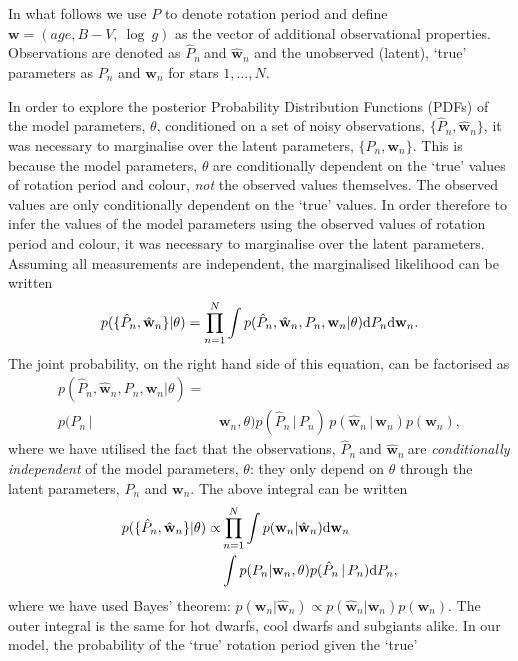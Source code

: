 \documentclass[useAMS, usenatbib]{mn2e}
\newcommand{\w}{\mathbf{w}}
\newcommand{\wh}{$\hat{\mathbf{w}}_n$}
\newcommand{\ph}{$\hat{P}_n$}
\begin{document}
In what follows we use $P$ to denote rotation period and define
$\mathbf{w} = (age, B-V,~\log~g)$ as the vector of additional observational
properties.
Observations are denoted as \ph$~$and $\hat{\mathbf{w}}_n$ and the unobserved
(latent), `true' parameters as $P_n$ and $\mathbf{w}_n$ for stars $1,...,N$.

In order to explore the posterior Probability Distribution Functions (PDFs) of
the model parameters, $\theta$, conditioned on a set of noisy observations,
$\{\hat{P}_n, \hat{\mathbf{w}}_n\}$, it was necessary to marginalise over the
latent parameters, $\{P_n, \mathbf{w}_n\}$.
This is because the model parameters, $\theta$ are conditionally dependent on
the `true' values of rotation period and colour, \emph{not} the observed
values themselves.
The observed values are only conditionally dependent on the `true' values.
In order therefore to infer the values of the model parameters using the
observed values of rotation period and colour, it was necessary to marginalise
over the latent parameters.  %
Assuming all measurements are independent, the marginalised likelihood can be
written
\begin{equation}
	p(\{\hat{P}_n,\hat{\w}_n\}|\theta) =
	\prod_{n=1}^{N} \int p(\hat{P}_n,\hat{\w}_n,P_n,\w_n|\theta)
	{\rm d}P_n {\rm d}\w_n.
\label{eq:fulll}
\end{equation}
The joint probability, on the right hand side of this equation, can be
factorised as
\begin{align}
	p(\hat{P}_n,\hat{\w}_n,P_n,\w_n|\theta) = & \\
	p(P_n\,| & \,\w_n,\theta)
	p(\hat{P}_n\,|\,P_n)\,p(\hat{\w}_n\,|\,\w_n)p(\w_n),
\nonumber
\end{align}
where we have utilised the fact that the observations, \ph$~$and \wh$~$are
{\it conditionally independent} of the model parameters, $\theta$: they only
depend on $\theta$ through the latent parameters, $P_n$ and $\w_n$.
The above integral can  be written
\begin{eqnarray}
	p(\{\hat{P}_n,\hat{\w}_n\}|\theta) \propto &
	\prod_{n=1}^{N} \int p(\w_n|\hat{\w}_n) {\rm d}\w_n \\ \nonumber
	& \int p(P_n|\w_n,\theta) p(\hat{P}_n\,|\,P_n) {\rm d}P_n,
\label{eq:fac}
\end{eqnarray}
where we have used Bayes' theorem:
$p(\w_n|\hat{\w}_n) \propto p(\hat{\w}_n|\w_n)p(\w_n)$.
The outer integral is the same for hot dwarfs, cool dwarfs and subgiants
alike.
In our model, the probability of the `true' rotation period given the `true'
\end{document}
